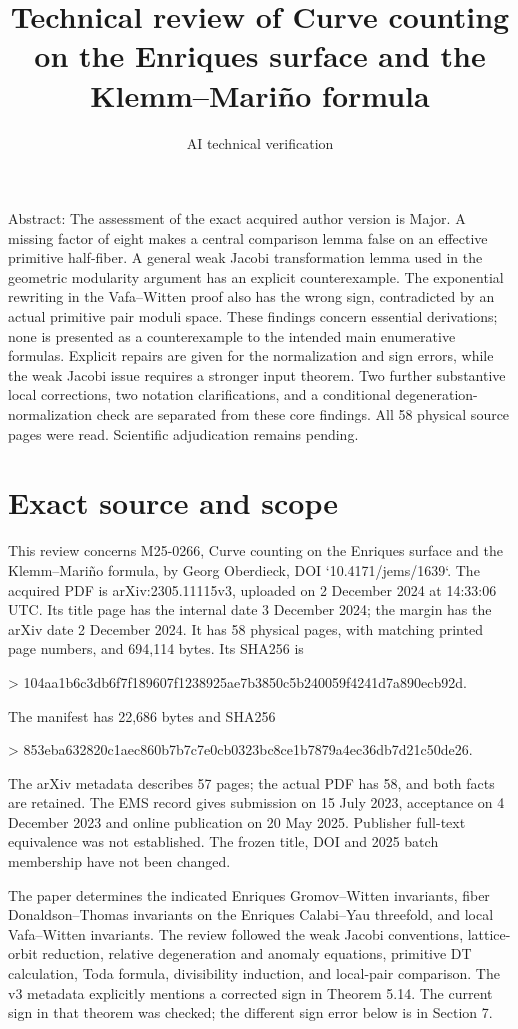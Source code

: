 \documentclass[10pt]{article}
\title{Technical review of
Curve counting on the Enriques surface and the Klemm–Mariño formula}
\author{AI technical verification}
\date{}
\begin{document}
\maketitle
Abstract: The assessment of the exact acquired author version is Major. A missing factor of eight makes a central comparison lemma false on an effective primitive half-fiber. A general weak Jacobi transformation lemma used in the geometric modularity argument has an explicit counterexample. The exponential rewriting in the Vafa–Witten proof also has the wrong sign, contradicted by an actual primitive pair moduli space. These findings concern essential derivations; none is presented as a counterexample to the intended main enumerative formulas. Explicit repairs are given for the normalization and sign errors, while the weak Jacobi issue requires a stronger input theorem. Two further substantive local corrections, two notation clarifications, and a conditional degeneration-normalization check are separated from these core findings. All 58 physical source pages were read. Scientific adjudication remains pending.\par
\section*{Exact source and scope}
This review concerns M25-0266, Curve counting on the Enriques surface and the Klemm–Mariño formula, by Georg Oberdieck, DOI `10.4171/jems/1639`. The acquired PDF is arXiv:2305.11115v3, uploaded on 2 December 2024 at 14:33:06 UTC. Its title page has the internal date 3 December 2024; the margin has the arXiv date 2 December 2024. It has 58 physical pages, with matching printed page numbers, and 694,114 bytes. Its SHA256 is\par
> 104aa1b6c3db6f7f189607f1238925ae7b3850c5b240059f4241d7a890ecb92d.\par
The manifest has 22,686 bytes and SHA256\par
> 853eba632820c1aec860b7b7c7e0cb0323bc8ce1b7879a4ec36db7d21c50de26.\par
The arXiv metadata describes 57 pages; the actual PDF has 58, and both facts are retained. The EMS record gives submission on 15 July 2023, acceptance on 4 December 2023 and online publication on 20 May 2025. Publisher full-text equivalence was not established. The frozen title, DOI and 2025 batch membership have not been changed.\par
The paper determines the indicated Enriques Gromov–Witten invariants, fiber Donaldson–Thomas invariants on the Enriques Calabi–Yau threefold, and local Vafa–Witten invariants. The review followed the weak Jacobi conventions, lattice-orbit reduction, relative degeneration and anomaly equations, primitive DT calculation, Toda formula, divisibility induction, and local-pair comparison. The v3 metadata explicitly mentions a corrected sign in Theorem 5.14. The current sign in that theorem was checked; the different sign error below is in Section 7.\par
\end{document}

